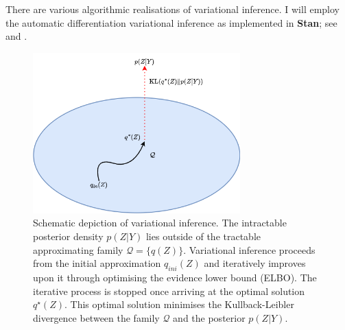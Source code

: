 \documentclass[]{article}
\begin{document}
There are various algorithmic realisations of variational inference. I will employ the automatic differentiation variational inference as implemented in {\bf Stan}; see \citet{kucukelbir2015} and \citet{kucukelbir2017}.

\begin{figure}[h]
	\centering
	\includegraphics[width=8cm]{VI2.png}
	\caption{Schematic depiction of variational inference. The intractable posterior density $p(Z|Y)$ lies outside of the tractable approximating family $\mathcal{Q} = \{ q(Z) \}$. Variational inference proceeds from the initial approximation $q_{ini}(Z)$ and iteratively improves upon it through optimising the evidence lower bound (ELBO). The iterative process is stopped once  arriving at the optimal solution $q^{\star}(Z)$. This optimal solution minimises the Kullback-Leibler divergence between the family $\mathcal{Q}$ and the posterior $p(Z|Y)$.}
	\label{fig:VI2}
\end{figure}
\end{document}
